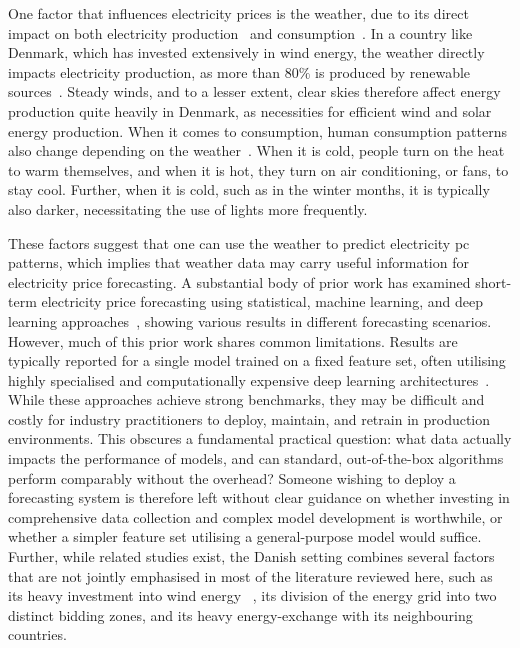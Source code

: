 One factor that influences electricity prices is the weather, due to its direct 
impact on both electricity production~\cite{productionPatterns} and 
consumption~\cite{consumptionPatterns}. In a 
country like Denmark, which has invested 
extensively in wind energy, the weather directly 
impacts 
electricity production, as more than $80\%$ is produced by renewable 
sources~\cite{energiStyrelsenEnergiStatestik2022}. Steady winds, and to a 
lesser extent, clear skies therefore affect energy production quite heavily in 
Denmark, as necessities for efficient wind and solar energy production. When it 
comes to consumption, human consumption patterns also change depending on the 
weather~\cite{consumptionPatterns}. When it is cold, people turn on the heat to 
warm themselves, and when it is hot, they turn on air conditioning, or fans, to 
stay cool. Further, when it is cold, such as in the winter months, it is 
typically also darker, necessitating the use of 
lights more frequently. 

These factors suggest that one can use the weather to predict electricity 
\gls{pc} patterns, which implies that weather data may carry useful information 
for electricity price forecasting. A substantial body of prior work has 
examined short-term electricity price forecasting using statistical, 
machine learning, and deep learning 
approaches~\cite{energyPricePredictionMLNeighbors,energyPricePredictionUK,energyPricePredictionNovelDeepLearning},
 showing various results in different forecasting scenarios. 
However, much of this prior work shares common limitations. Results are 
typically reported for a single model trained on a fixed feature set, often 
utilising highly specialised and computationally 
expensive deep learning 
architectures~\cite{energyPricePredictionNovelDeepLearning}. While these 
approaches achieve strong benchmarks, they may be difficult and costly for 
industry practitioners to deploy, maintain, and retrain in production 
environments. This obscures a fundamental practical question: what data 
actually impacts the performance of models, and can standard, out-of-the-box 
algorithms perform comparably without the overhead? Someone wishing to deploy a 
forecasting system is therefore left without clear guidance on whether 
investing in comprehensive data collection and complex model development is 
worthwhile, or whether a simpler feature set 
utilising a general-purpose model 
would suffice. Further, while related studies exist, the Danish setting 
combines several factors that are not jointly 
emphasised in most of the 
literature reviewed here, such as its heavy 
investment into wind energy 
~\cite{energiStyrelsenEnergiStatestik2022}, its division of the energy grid 
into two distinct bidding zones, and its heavy energy-exchange with its 
neighbouring countries. \\

